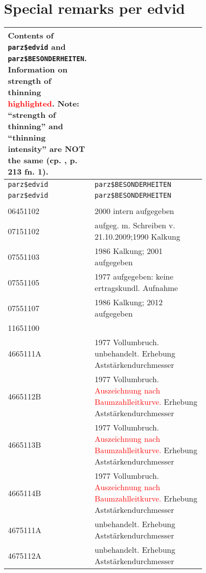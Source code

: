 \section{Special remarks per edvid}

\begin{singlespace}
  {\tabulinesep=2mm
    \begin{longtabu}{l p{0.8\linewidth}}
      \caption{Contents of \texttt{parz\$edvid} and \texttt{parz\$BESONDERHEITEN}.  Information on strength of thinning \textcolor{red}{highlighted}. \\
        Note:  ``strength of thinning'' and ``thinning intensity'' are NOT the same (cp. \textcite{Assmann1961}, p. 213 fn. 1). \label{tab:special_remarks}} \\
      \toprule
      \texttt{parz\$edvid} & \texttt{parz\$BESONDERHEITEN} \\
      \midrule
      \endfirsthead
      \texttt{parz\$edvid} & \texttt{parz\$BESONDERHEITEN} \\
      \midrule
      \endhead
      \bottomrule
       & \\
      06451102 & 2000  intern aufgegeben \\
      07151102 & aufgeg. m. Schreiben v. 21.10.2009;1990 Kalkung \\
      07551103 & 1986 Kalkung; 2001 aufgegeben \\
      07551105 & 1977 aufgegeben:  keine ertragskundl. Aufnahme \\
      07551107 & 1986 Kalkung; 2012 aufgegeben \\
      11651100 & \\
      4665111A & 1977 Vollumbruch. unbehandelt. Erhebung Aststärkendurchmesser \\
      4665112B & 1977 Vollumbruch. \textcolor{red}{Auszeichnung nach Baumzahlleitkurve.} Erhebung Aststärkendurchmesser \\
      4665113B & 1977 Vollumbruch. \textcolor{red}{Auszeichnung nach Baumzahlleitkurve.} Erhebung Aststärkendurchmesser \\
      4665114B & 1977 Vollumbruch. \textcolor{red}{Auszeichnung nach Baumzahlleitkurve.} Erhebung Aststärkendurchmesser \\
      4675111A & unbehandelt. Erhebung Aststärkendurchmesser \\
      4675112A & unbehandelt. Erhebung Aststärkendurchmesser \\

\end{longtabu}}
\end{singlespace}
